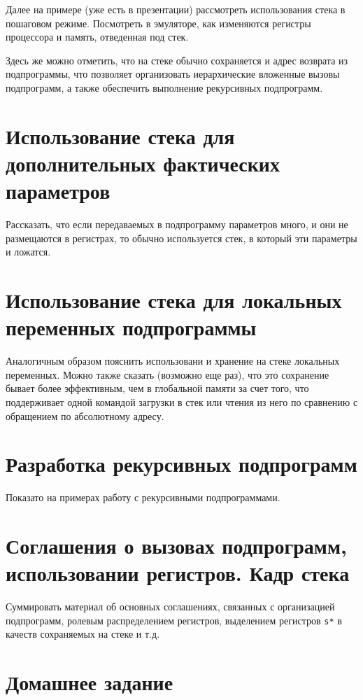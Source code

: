 Далее на примере (уже есть в презентации) рассмотреть использования стека в пошаговом режиме. Посмотреть в эмуляторе, как изменяются регистры процессора и память, отведенная под стек.

Здесь же можно отметить, что на стеке обычно сохраняется и адрес возврата из подпрограммы, что позволяет организовать иерархические вложенные вызовы подпрограмм, а также обеспечить выполнение рекурсивных подпрограмм.

\section{Использование стека для дополнительных фактических параметров}

Рассказать, что если передаваемых в подпрограмму параметров много, и они не размещаются в регистрах, то обычно используется стек, в который эти параметры и ложатся.


\section{Использование стека для локальных переменных подпрограммы}

Аналогичным образом пояснить использовани и хранение на стеке локальных переменных. Можно также сказать (возможно еще раз), что это сохранение бывает более эффективным, чем в глобальной памяти за счет того, что поддерживает одной командой загрузки в стек или чтения из него по сравнению с обращением по абсолютному адресу.

\section{Разработка рекурсивных подпрограмм}

Показато на примерах работу с рекурсивными подпрограммами.

\section{Соглашения о вызовах подпрограмм, использовании регистров. Кадр стека}

Суммировать материал об основных соглашениях, связанных с организацией подпрограмм, ролевым распределением регистров, выделением регистров \verb|s*| в качеств сохраняемых на стеке и т.д.

\section{Домашнее задание}

